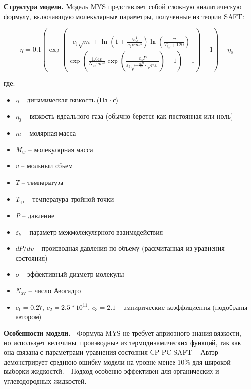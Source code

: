 \documentclass[a4paper,12pt]{article}
\begin{document}
      \textbf{Структура модели.}  
      Модель MYS представляет собой сложную аналитическую формулу, включающую молекулярные параметры, полученные из теории SAFT:
      
      \begin{equation}
        \eta = 0.1 \left( \exp \left( \frac{c_1 \sqrt{m} + \ln \left( 1 + \frac{M_w^4}{c_2 v^4 m^3} \right) \ln \left( \frac{T}{T_{\text{tp}} + 120} \right)}{
        \exp \left( \frac{1.04 v}{N_{\text{av}} m \sigma^3} \exp \left( \frac{c_3 P}{\varepsilon_k \sqrt{-\frac{dP}{dv} \cdot \sqrt{m v}}} \right) - 1 \right) - 1} 
        \right) - 1 \right) + \eta_0
        \label{eq:mys}
      \end{equation}
      
      где:  
      \begin{itemize}
        \item $\eta$ -- динамическая вязкость (Па·с)
        \item $\eta_0$ -- вязкость идеального газа (обычно берется как постоянная или ноль)
        \item $m$ -- молярная масса
        \item $M_w$ -- молекулярная масса
        \item $v$ -- мольный объем
        \item $T$ -- температура
        \item $T_{\text{tp}}$ -- температура тройной точки
        \item $P$ -- давление
        \item $\varepsilon_k$ -- параметр межмолекулярного взаимодействия
        \item $dP/dv$ -- производная давления по объему (рассчитанная из уравнения состояния)
        \item $\sigma$ -- эффективный диаметр молекулы
        \item $N_{\text{av}}$ -- число Авогадро
        \item $c_1=0.27$, $c_2=2.5*10^{11}$, $c_3=2.1$ -- эмпирические коэффициенты (подобраны автором)
      \end{itemize}
      
      \textbf{Особенности модели.}  
      - Формула MYS не требует априорного знания вязкости, но использует величины, производные из термодинамических функций, так как она связана с параметрами уравнения состояния CP-PC-SAFT.
      - Автор демонстрирует среднюю ошибку модели на уровне менее 10\% для широкой выборки жидкостей.
      - Подход особенно эффективен для органических и углеводородных жидкостей.
      
\end{document}
